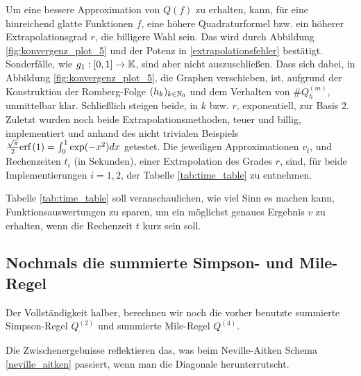 Um eine bessere Approximation von $Q(f)$ zu erhalten, kann, für eine hinreichend glatte Funktionen $f$, eine höhere Quadraturformel bzw. ein höherer Extrapolationsgrad $r$, die billigere Wahl sein. Das wird durch Abbildung \ref{fig:konvergenz_plot_5} und der Potenz in \eqref{extrapolationsfehler} bestätigt. \\

Sonderfälle, wie $g_1: [0, 1] \to \mathbb{K}$, sind aber nicht auszuschließen. Dass sich dabei, in Abbildung \ref{fig:konvergenz_plot_5}, die Graphen verschieben, ist, aufgrund der Konstruktion der Romberg-Folge $(h_k)_{k \in \mathbb{N}_0}$ und dem Verhalten von $\# Q_h^{(m)}$, unmittelbar klar. Schließlich steigen beide, in $k$ bzw. $r$, exponentiell, zur Basis $2$. \\

Zuletzt wurden noch beide Extrapolationsmethoden, teuer und billig, implementiert und anhand des nicht trivialen Beispiels $\frac{\sqrt{\pi}}{2} \text{erf} \left ( 1 \right ) = \int_0^1 \exp(-x^2) dx$ getestet. Die jeweiligen Approximationen $v_i$, und Rechenzeiten $t_i$ (in Sekunden), einer Extrapolation des Grades $r$, sind, für beide Implementierungen $i = 1, 2$, der Tabelle \ref{tab:time_table} zu entnehmen.



Tabelle \ref{tab:time_table} soll veranschaulichen, wie viel Sinn es machen kann, Funktionsauswertungen zu sparen, um ein möglichst genaues Ergebnis $v$ zu erhalten, wenn die Rechenzeit $t$ kurz sein soll.

\subsection{Nochmals die summierte Simpson- und Mile-Regel}

Der Vollständigkeit halber, berechnen wir noch die vorher benutzte summierte Simpson-Regel $Q_\cdot^{(2)}$ und summierte Mile-Regel $Q_\cdot^{(4)}$.




Die Zwischenergebnisse reflektieren das, was beim Neville-Aitken Schema \eqref{neville_aitken} passiert, wenn man die Diagonale herunterrutscht.
